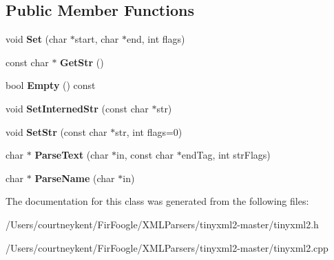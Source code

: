 \subsection*{Public Member Functions}
\begin{DoxyCompactItemize}
\item 
\hypertarget{classtinyxml2_1_1_str_pair_a4f05549373394266a1eecba26813c166}{void {\bfseries Set} (char $\ast$start, char $\ast$end, int flags)}\label{classtinyxml2_1_1_str_pair_a4f05549373394266a1eecba26813c166}

\item 
\hypertarget{classtinyxml2_1_1_str_pair_ad87e3d11330f5e689ba1e7e54c023b57}{const char $\ast$ {\bfseries Get\+Str} ()}\label{classtinyxml2_1_1_str_pair_ad87e3d11330f5e689ba1e7e54c023b57}

\item 
\hypertarget{classtinyxml2_1_1_str_pair_affa1043e73a18f05d5d2faec055725a7}{bool {\bfseries Empty} () const }\label{classtinyxml2_1_1_str_pair_affa1043e73a18f05d5d2faec055725a7}

\item 
\hypertarget{classtinyxml2_1_1_str_pair_a2baf6230e18333e02ab65d0897ee3941}{void {\bfseries Set\+Interned\+Str} (const char $\ast$str)}\label{classtinyxml2_1_1_str_pair_a2baf6230e18333e02ab65d0897ee3941}

\item 
\hypertarget{classtinyxml2_1_1_str_pair_a1f82ec6b5bee35ee7466d8565e43b1de}{void {\bfseries Set\+Str} (const char $\ast$str, int flags=0)}\label{classtinyxml2_1_1_str_pair_a1f82ec6b5bee35ee7466d8565e43b1de}

\item 
\hypertarget{classtinyxml2_1_1_str_pair_ad90521f188e9606a8fbafe5d86fb2246}{char $\ast$ {\bfseries Parse\+Text} (char $\ast$in, const char $\ast$end\+Tag, int str\+Flags)}\label{classtinyxml2_1_1_str_pair_ad90521f188e9606a8fbafe5d86fb2246}

\item 
\hypertarget{classtinyxml2_1_1_str_pair_aa6d8998efceba41d87ec2300c70a6085}{char $\ast$ {\bfseries Parse\+Name} (char $\ast$in)}\label{classtinyxml2_1_1_str_pair_aa6d8998efceba41d87ec2300c70a6085}

\end{DoxyCompactItemize}


The documentation for this class was generated from the following files\+:\begin{DoxyCompactItemize}
\item 
/\+Users/courtneykent/\+Fir\+Foogle/\+X\+M\+L\+Parsers/tinyxml2-\/master/tinyxml2.\+h\item 
/\+Users/courtneykent/\+Fir\+Foogle/\+X\+M\+L\+Parsers/tinyxml2-\/master/tinyxml2.\+cpp\end{DoxyCompactItemize}
